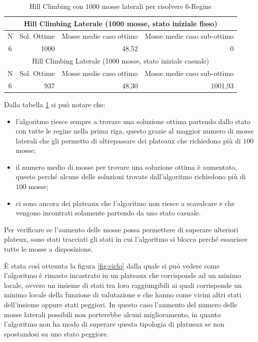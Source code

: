 \begin{table}[]
\centering

\begin{tabular}{|c|c|c|c|}
\hline
\multicolumn{4}{|c|}{Hill Climbing Laterale (1000 mosse, stato iniziale fisso)} \\ \hline
N & Sol. Ottime & Mosse medie caso ottimo & Mosse medie caso sub-ottimo \\ \hline
6 & \multicolumn{1}{r|}{1000} & \multicolumn{1}{r|}{48,52} & \multicolumn{1}{r|}{0} \\ \hline
\multicolumn{4}{|c|}{Hill Climbing Laterale (1000 mosse, stato iniziale casuale)} \\ \hline
N & Sol. Ottime & Mosse medie caso ottimo & Mosse medie caso sub-ottimo \\ \hline
6 & \multicolumn{1}{r|}{937} & \multicolumn{1}{r|}{48,30} & \multicolumn{1}{r|}{1001,93} \\ \hline
\end{tabular}

\caption{Hill Climbing con $1000$ mosse laterali per risolvere $6$-Regine}
\label{table:6regine-1000}
\end{table}

Dalla tabella \ref{table:6regine-1000} si può notare che:
\begin{itemize}
\item l'algoritmo riesce sempre a trovare una soluzione ottima partendo dallo stato con tutte le regine nella prima riga, questo grazie al maggior numero di mosse laterali che gli permetto di oltrepassare dei plateaux che richiedono più di $100$ mosse;
\item il numero medio di mosse per trovare una soluzione ottima è aumentato, questo perché alcune delle soluzioni trovate dall'algoritmo richiedono più di $100$ mosse;
\item ci sono ancora dei plateaux che l'algoritmo non riesce a scavalcare e che vengono incontrati solamente partendo da uno stato casuale.
\end{itemize}

Per verificare se l'aumento delle mosse possa permettere di superare ulteriori plateux, sono stati tracciati gli stati in cui l'algoritmo si blocca perché esaurisce tutte le mosse a disposizione.

\`{E} stata così ottenuta la figura \ref{fig:ciclo} dalla quale si può vedere come l'algoritmo è rimasto incastrato in un plateaux che corrisponde ad un minimo locale, ovvero un insieme di stati tra loro raggiungibili ai quali corrisponde un minimo locale della funzione di valutazione e che hanno come vicini altri stati dell'insieme oppure stati peggiori.
In questo caso l'aumento del numero delle mosse laterali possibili non porterebbe alcuni miglioramento, in quanto l'algoritmo non ha modo di superare questa tipologia di platueax se non spostandosi su uno stato peggiore.

